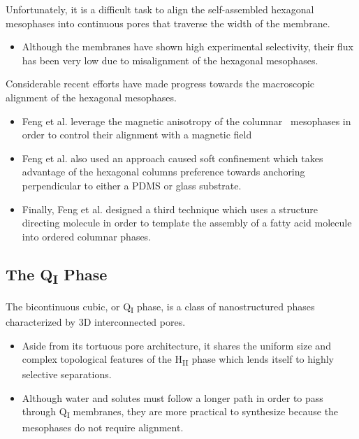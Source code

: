   Unfortunately, it is a difficult task to align the self-assembled hexagonal
  mesophases into continuous pores that traverse the width of the membrane.
  \begin{itemize}
    \item Although the membranes have shown high experimental selectivity, their 
    flux has been very low due to misalignment of the hexagonal mesophases.
  \end{itemize}
  
  Considerable recent efforts have made progress towards the macroscopic
  alignment of the hexagonal mesophases.
  \begin{itemize}
    \item Feng et al. leverage the magnetic anisotropy of the columnar \
    mesophases in order to control their alignment with a magnetic field~\cite{feng_scalable_2014}
    \item Feng et al. also used an approach caused soft confinement which
    takes advantage of the hexagonal columns preference towards anchoring
    perpendicular to either a PDMS or glass substrate.~\cite{feng_thin_2016}
    \item Finally, Feng et al. designed a third technique which uses a structure
    directing molecule in order to template the assembly of a fatty acid 
    molecule into ordered columnar phases.~\cite{feng_highly_2017}
  \end{itemize}
  
  \subsection{The Q\textsubscript{I} Phase}
  
  The bicontinuous cubic, or Q\textsubscript{I} phase, is a class 
  of nanostructured phases characterized by 3D interconnected pores.
  \begin{itemize}
    \item Aside from its tortuous pore architecture, it shares the 
    uniform size and complex topological features of the H\textsubscript{II} phase
    which lends itself to highly selective separations.
    \item Although water and solutes must follow a longer path in order to pass
    through Q\textsubscript{I} membranes, they are more practical to synthesize
    because the mesophases do not require alignment. 
  \end{itemize}
  
